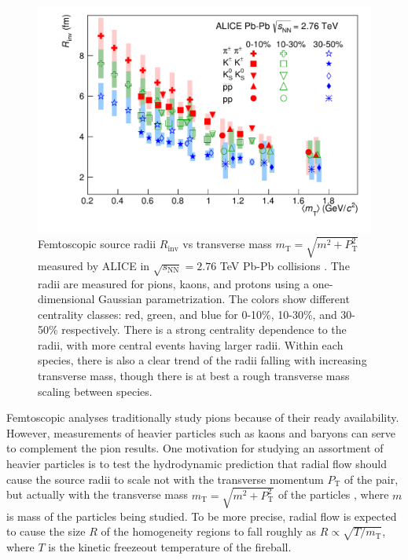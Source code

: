 \begin{figure}[hbt]
\includegraphics[width=36pc]{Figures/BorrowedFigures/ALICERadii.pdf}
\caption[Transverse mass dependence of femtoscopic source radii at ALICE]{Femtoscopic source radii $R_\mathrm{inv}$ vs transverse mass $m_\mathrm{T} = \sqrt{m^2 + P^2_\mathrm{T}}$ measured by ALICE in $\sqrt{s_\mathrm{NN}} = 2.76$ TeV Pb-Pb collisions \cite{Adam:2015vja}.
The radii are measured for pions, kaons, and protons using a one-dimensional Gaussian parametrization.
The colors show different centrality classes: red, green, and blue for 0-10\%, 10-30\%, and 30-50\% respectively.
There is a strong centrality dependence to the radii, with more central events having larger radii.
Within each species, there is also a clear trend of the radii falling with increasing transverse mass, though there is at best a rough transverse mass scaling between species.}
\label{fig:ALICERadii}
\end{figure}
Femtoscopic analyses traditionally study pions \cite{Goldhaber:1960sf,Aamodt:2011mr} because of their ready availability.  
However, measurements of heavier particles such as kaons \cite{Abelev:2012ms} and baryons \cite{Gos:2007cj} can serve to complement the pion results.  
One motivation for studying an assortment of heavier particles is to test the hydrodynamic prediction that radial flow should cause the source radii to scale not with the transverse momentum $P_\mathrm{T}$ of the pair, but actually with the transverse mass  $m_{\mathrm{T}} = \sqrt{m^2 + P^2_\mathrm{T}}$ of the particles \cite{Csorgo:1995bi,Lisa:2005dd}, where $m$ is mass of the particles being studied.
To be more precise, radial flow is expected to cause the size $R$ of the homogeneity regions to fall roughly as $R \propto \sqrt{T/m_\mathrm{T}}$, where $T$ is the kinetic freezeout temperature of the fireball.
